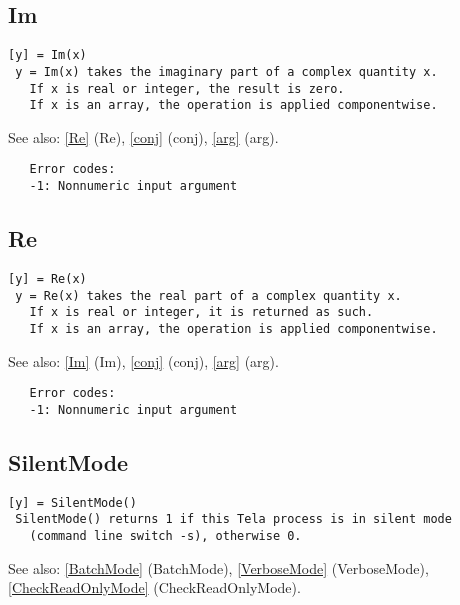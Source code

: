 \documentclass[a4paper]{article}
\begin{document}
\subsection{Im\label{Im}}

\begin{tscreen}
\begin{verbatim}
[y] = Im(x)
 y = Im(x) takes the imaginary part of a complex quantity x.
   If x is real or integer, the result is zero.
   If x is an array, the operation is applied componentwise.
\end{verbatim}

See also: \ref{Re} {(Re)}, \ref{conj} {(conj)}, \ref{arg} {(arg)}.
\begin{verbatim}
   Error codes:
   -1: Nonnumeric input argument 
\end{verbatim}
\end{tscreen}



\subsection{Re\label{Re}}

\begin{tscreen}
\begin{verbatim}
[y] = Re(x)
 y = Re(x) takes the real part of a complex quantity x.
   If x is real or integer, it is returned as such.
   If x is an array, the operation is applied componentwise.
\end{verbatim}

See also: \ref{Im} {(Im)}, \ref{conj} {(conj)}, \ref{arg} {(arg)}.
\begin{verbatim}
   Error codes:
   -1: Nonnumeric input argument 
\end{verbatim}
\end{tscreen}



\subsection{SilentMode\label{SilentMode}}

\begin{tscreen}
\begin{verbatim}
[y] = SilentMode()
 SilentMode() returns 1 if this Tela process is in silent mode
   (command line switch -s), otherwise 0.
\end{verbatim}

See also: \ref{BatchMode} {(BatchMode)}, \ref{VerboseMode} {(VerboseMode)}, \ref{CheckReadOnlyMode} {(CheckReadOnlyMode)}.
\end{tscreen}
\end{document}
